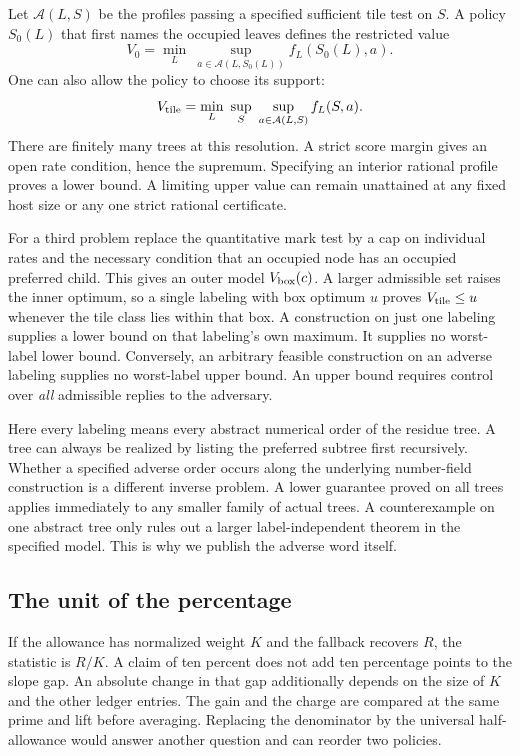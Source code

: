 Let \(\mathcal A(L,S)\) be the profiles passing a specified sufficient tile test on \(S\). A policy \(S_0(L)\) that first names the occupied leaves defines the restricted value
\[
 V_0=\min_L\ \sup_{a\in\mathcal A(L,S_0(L))} f_L(S_0(L),a).
\]
One can also allow the policy to choose its support:
\[
 V_{\rm tile}=\min_L\ \sup_{S}\ \sup_{a\in\mathcal A(L,S)} f_L(S,a).
\]
There are finitely many trees at this resolution. A strict score margin gives an open rate condition, hence the supremum. Specifying an interior rational profile proves a lower bound. A limiting upper value can remain unattained at any fixed host size or any one strict rational certificate.

For a third problem replace the quantitative mark test by a cap on individual rates and the necessary condition that an occupied node has an occupied preferred child. This gives an outer model \(V_{\rm box}(c)\). A larger admissible set raises the inner optimum, so a single labeling with box optimum \(u\) proves \(V_{\rm tile}\le u\) whenever the tile class lies within that box. A construction on just one labeling supplies a lower bound on that labeling's own maximum. It supplies no worst-label lower bound. Conversely, an arbitrary feasible construction on an adverse labeling supplies no worst-label upper bound. An upper bound requires control over \emph{all} admissible replies to the adversary.

Here every labeling means every abstract numerical order of the residue tree. A tree can always be realized by listing the preferred subtree first recursively. Whether a specified adverse order occurs along the underlying number-field construction is a different inverse problem. A lower guarantee proved on all trees applies immediately to any smaller family of actual trees. A counterexample on one abstract tree only rules out a larger label-independent theorem in the specified model. This is why we publish the adverse word itself.

\subsection{The unit of the percentage}
If the allowance has normalized weight \(K\) and the fallback recovers \(R\), the statistic is \(R/K\). A claim of ten percent does not add ten percentage points to the slope gap. An absolute change in that gap additionally depends on the size of \(K\) and the other ledger entries. The gain and the charge are compared at the same prime and lift before averaging. Replacing the denominator by the universal half-allowance would answer another question and can reorder two policies.

